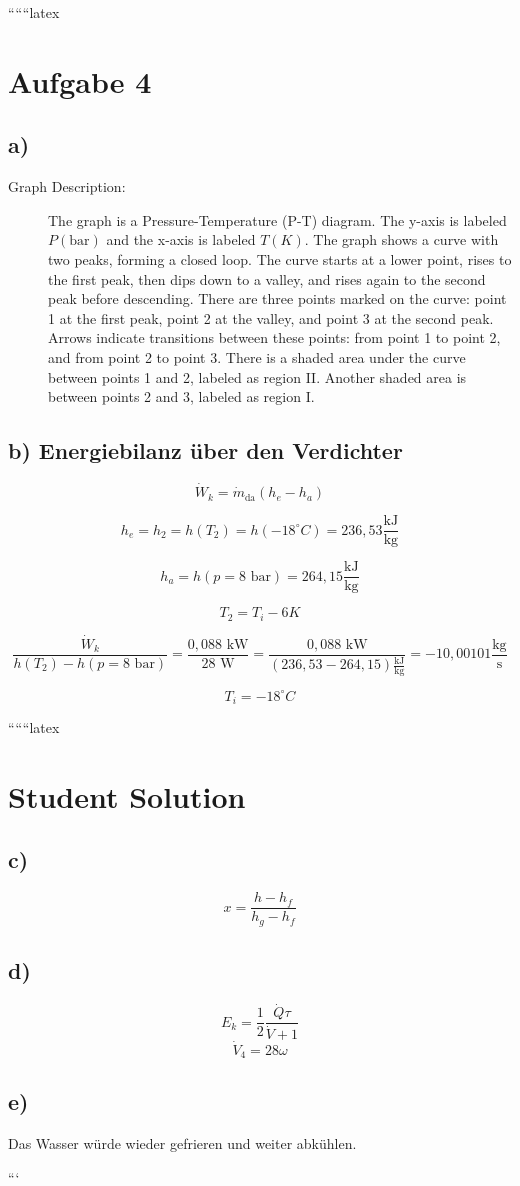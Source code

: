 
``````latex


\section*{Aufgabe 4}

\subsection*{a)}

\begin{description}
    \item[Graph Description:] The graph is a Pressure-Temperature (P-T) diagram. The y-axis is labeled \(P (\text{bar})\) and the x-axis is labeled \(T (K)\). The graph shows a curve with two peaks, forming a closed loop. The curve starts at a lower point, rises to the first peak, then dips down to a valley, and rises again to the second peak before descending. There are three points marked on the curve: point 1 at the first peak, point 2 at the valley, and point 3 at the second peak. Arrows indicate transitions between these points: from point 1 to point 2, and from point 2 to point 3. There is a shaded area under the curve between points 1 and 2, labeled as region II. Another shaded area is between points 2 and 3, labeled as region I.
\end{description}

\subsection*{b) Energiebilanz über den Verdichter}

\[
\dot{W}_k = \dot{m}_{\text{da}} (h_e - h_a)
\]

\[
h_e = h_2 = h(T_2) = h(-18^\circ C) = 236,53 \frac{\text{kJ}}{\text{kg}}
\]

\[
h_a = h(p = 8 \text{ bar}) = 264,15 \frac{\text{kJ}}{\text{kg}}
\]

\[
T_2 = T_i - 6 K
\]

\[
\frac{\dot{W}_k}{h(T_2) - h(p = 8 \text{ bar})} = \frac{0,088 \text{ kW}}{28 \text{ W}} = \frac{0,088 \text{ kW}}{(236,53 - 264,15) \frac{\text{kJ}}{\text{kg}}} = -10,00101 \frac{\text{kg}}{\text{s}}
\]

\[
T_i = -18^\circ C
\]

``````latex


\section*{Student Solution}

\subsection*{c)}
\[
x = \frac{h - h_f}{h_g - h_f}
\]

\subsection*{d)}
\[
E_k = \frac{1}{2} \frac{\dot{Q} \tau}{\dot{V} + 1}
\]
\[
\dot{V}_4 = 28 \omega
\]

\subsection*{e)}
Das Wasser würde wieder gefrieren und weiter abkühlen.

```
